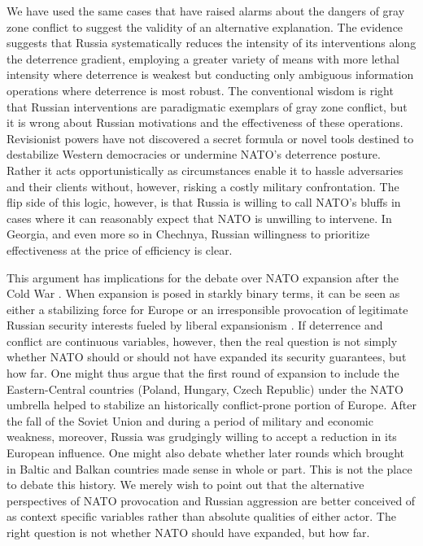 \documentclass[11pt,letterpaper,pdftex,dvipsnames,table]{article}
\begin{document}
We have used the same cases that have raised alarms about the dangers of gray zone conflict to suggest the validity of an alternative explanation. The evidence suggests that Russia systematically reduces the intensity of its interventions along the deterrence gradient, employing a greater variety of means with more lethal intensity where deterrence is weakest but conducting only ambiguous information operations where deterrence is most robust. The conventional wisdom is right that Russian interventions are paradigmatic exemplars of gray zone conflict, but it is wrong about Russian motivations and the effectiveness of these operations. Revisionist powers have not discovered a secret formula or novel tools destined to destabilize Western democracies or undermine NATO's deterrence posture. Rather it acts opportunistically as circumstances enable it to hassle adversaries and their clients without, however, risking a costly military confrontation. The flip side of this logic, however, is that Russia is willing to call NATO’s bluffs in cases where it can reasonably expect that NATO is unwilling to intervene. In Georgia, and even more so in Chechnya, Russian willingness to prioritize effectiveness at the price of efficiency is clear.

This argument has implications for the debate over NATO expansion after the Cold War \citep{shifrinson_dealnodeal_2016, lanoszka_thankgoodnessnato_2020}. When expansion is posed in starkly binary terms, it can be seen as either a stabilizing force for Europe or an irresponsible provocation of legitimate Russian security interests fueled by liberal expansionism \citep{mcfaul_faultypowers_2014, mearsheimer_whyukrainecrisis_2014}. If deterrence and conflict are continuous variables, however, then the real question is not simply whether NATO should or should not have expanded its security guarantees, but how far. One might thus argue that the first round of expansion to include the Eastern-Central countries (Poland, Hungary, Czech Republic) under the NATO umbrella helped to stabilize an historically conflict-prone portion of Europe. After the fall of the Soviet Union and during a period of military and economic weakness, moreover, Russia was grudgingly willing to accept a reduction in its European influence. One might also debate whether later rounds which brought in Baltic and Balkan countries made sense in whole or part. This is not the place to debate this history. We merely wish to point out that the alternative perspectives of NATO provocation and Russian aggression are better conceived of as context specific variables rather than absolute qualities of either actor. The right question is not whether NATO should have expanded, but how far.
\end{document}
